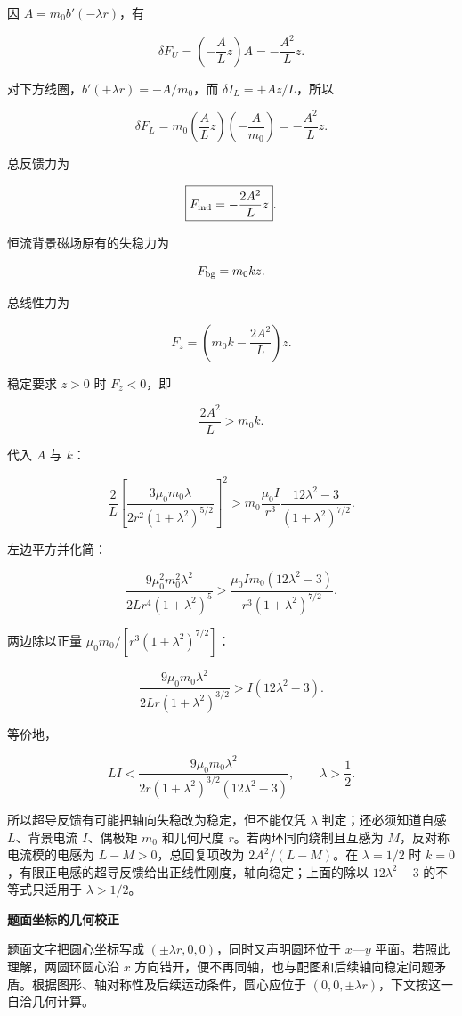 \documentclass[12pt,a4paper,UTF8]{ctexart}
\begin{document}
因 \(A=m_0b'(-\lambda r)\)，有

\[
\delta F_U
=\left(-\frac A Lz\right)A
=-\frac{A^2}{L}z.
\]

对下方线圈，\(b'(+\lambda r)=-A/m_0\)，而 \(\delta I_L=+Az/L\)，所以

\[
\delta F_L
=m_0\left(\frac A Lz\right)
\left(-\frac A{m_0}\right)
=-\frac{A^2}{L}z.
\]

总反馈力为

\[
\boxed{
F_{\rm ind}=-\frac{2A^2}{L}z
}.
\]

恒流背景磁场原有的失稳力为

\[
F_{\rm bg}=m_0kz.
\]

总线性力为

\[
F_z=\left(m_0k-\frac{2A^2}{L}\right)z.
\]

稳定要求 \(z>0\) 时 \(F_z<0\)，即

\[
\frac{2A^2}{L}>m_0k.
\]

代入 \(A\) 与 \(k\)：

\[
\frac{2}{L}
\left[
\frac{3\mu_0m_0\lambda}
{2r^2(1+\lambda^2)^{5/2}}
\right]^2
>
m_0\frac{\mu_0I}{r^3}
\frac{12\lambda^2-3}{(1+\lambda^2)^{7/2}}.
\]

左边平方并化简：

\[
\frac{9\mu_0^2m_0^2\lambda^2}
{2Lr^4(1+\lambda^2)^5}
>
\frac{\mu_0Im_0(12\lambda^2-3)}
{r^3(1+\lambda^2)^{7/2}}.
\]

两边除以正量 \(\mu_0m_0/[r^3(1+\lambda^2)^{7/2}]\)：

\[
\boxed{
\frac{9\mu_0m_0\lambda^2}
{2Lr(1+\lambda^2)^{3/2}}
>I(12\lambda^2-3)
}.
\]

等价地，

\[
\boxed{
LI<
\frac{9\mu_0m_0\lambda^2}
{2r(1+\lambda^2)^{3/2}(12\lambda^2-3)}
},
\qquad \lambda>\frac12.
\]

所以超导反馈有可能把轴向失稳改为稳定，但不能仅凭 \(\lambda\)
判定；还必须知道自感 \(L\)、背景电流 \(I\)、偶极矩 \(m_0\) 和几何尺度
\(r\)。若两环同向绕制且互感为 \(M\)，反对称电流模的电感为
\(L-M>0\)，总回复项改为 \(2A^2/(L-M)\)。在 \(\lambda=1/2\) 时
\(k=0\)，有限正电感的超导反馈给出正线性刚度，轴向稳定；上面的除以
\(12\lambda^2-3\) 的不等式只适用于 \(\lambda>1/2\)。

\textbf{题面坐标的几何校正}

题面文字把圆心坐标写成 \((\pm\lambda r,0,0)\)，同时又声明圆环位于
\(x\)---\(y\) 平面。若照此理解，两圆环圆心沿 \(x\)
方向错开，便不再同轴，也与配图和后续轴向稳定问题矛盾。根据图形、轴对称性及后续运动条件，圆心应位于
\((0,0,\pm\lambda r)\)，下文按这一自洽几何计算。
\end{document}
